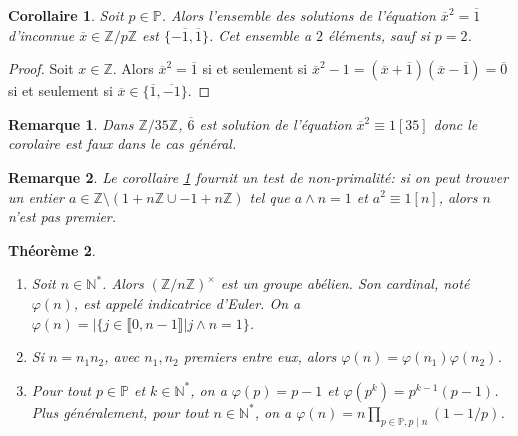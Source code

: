 \documentclass[12pt]{report}
\newtheorem{thm}{Théorème}[chapter]
\newtheorem*{rem}{Remarque}
\newtheorem{Cor}[thm]{Corollaire}
\newcommand{\N}{\mathbb{N}}
\newcommand{\Z}{\mathbb{Z}}
\begin{document}
\begin{Cor}\label{Cor}
Soit $p\in \mathbb{P}$. Alors l'ensemble des solutions de l'équation $\overline{x}^2 =\overline{1}$ d'inconnue $\overline{x}\in \Z/p\Z$ est $\{-\overline{1},\overline{1}\}$. Cet ensemble a $2$ éléments, sauf si $p=2$.
\end{Cor}

\begin{proof}
Soit $x\in \Z$. Alors $\overline{x}^2 =\overline{1}$ si et seulement si $\overline{x}^2-1= (\overline{x}+\overline{1})(\overline{x}-\overline{1})=\overline{0}$ si et seulement si $\overline{x}\in \{\overline{1},\overline{-1}\}$.
\end{proof}

\begin{rem}
Dans $\mathbb{Z}/35 \mathbb{Z}$, $\overline{6}$ est solution de l'équation $\overline{x}^2\equiv 1[35]$ donc le corolaire est faux dans le cas général.
\end{rem}

\begin{rem}
Le corollaire \ref{Cor} fournit un test de non-primalité: si on peut trouver un entier $a\in \Z\setminus (1+n\Z \cup -1+n\Z)$ tel que $a\wedge n=1$ et $a^2 \equiv 1 [n]$, alors $n$ n'est pas premier. 
\end{rem}

\begin{thm}
 \begin{enumerate}
\item Soit $n\in \N^*$. Alors  $(\mathbb{Z}/n \mathbb{Z})^{\times}$ est un groupe abélien. Son cardinal, noté $\varphi(n)$, est appelé indicatrice d'Euler. On a $\varphi(n)=|\{j\in \llbracket 0,n-1\rrbracket|j\wedge n=1\}$. \par 

\item Si $n=n_1n_2$, avec $n_1,n_2$ premiers entre eux, alors $\varphi(n)=\varphi(n_1)\varphi(n_2)$.

\item Pour tout  $p\in \mathbb{P}$ et $k\in \N^*$, on a $\varphi(p)=p-1$ et $\varphi(p^k)=p^{k-1}(p-1)$. Plus généralement, pour tout $n \in \mathbb{N}^*$, on a $\varphi(n)= n \prod_{p\in \mathbb{P}, p\mid n}(1-1/p)$.
\end{enumerate}

\end{thm}
\end{document}
